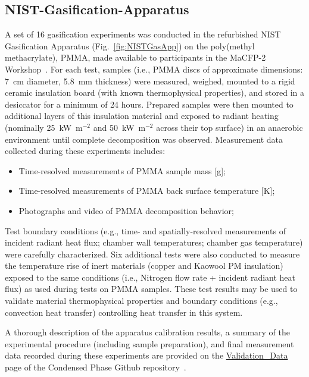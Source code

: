 \documentclass[12pt]{article}
\begin{document}
\subsection{NIST-Gasification-Apparatus}
A set of 16 gasification experiments was conducted in the refurbished NIST Gasification Apparatus (Fig.~\ref{fig:NISTGasApp}) on the poly(methyl methacrylate), PMMA, made available to participants in the MaCFP-2 Workshop~\cite{Leventon2023Gasification}. For each test, samples (i.e., PMMA discs of approximate dimensions: 7~cm diameter, 5.8~mm thickness) were measured, weighed, mounted to a rigid ceramic insulation board (with known thermophysical properties), and stored in a desiccator for a minimum of 24 hours. Prepared samples were then mounted to additional layers of this insulation material and exposed to radiant heating (nominally 25~kW~m$^{-2}$ and 50~kW~m$^{-2}$ across their top surface) in an anaerobic environment until complete decomposition was observed. Measurement data collected during these experiments includes:
\begin{itemize}[noitemsep]
\item Time-resolved measurements of PMMA sample mass [g];
\item Time-resolved measurements of PMMA back surface temperature [K];
\item Photographs and video of PMMA decomposition behavior;
\end{itemize}

Test boundary conditions (e.g., time- and spatially-resolved measurements of incident radiant heat flux; chamber wall temperatures; chamber gas temperature) were carefully characterized. Six additional tests were also conducted to measure the temperature rise of inert materials (copper and Kaowool PM insulation) exposed to the same conditions (i.e., Nitrogen flow rate + incident radiant heat flux) as used during tests on PMMA samples. These test results may be used to validate material thermophysical properties and boundary conditions (e.g., convection heat transfer) controlling heat transfer in this system.

A thorough description of the apparatus calibration results, a summary of the experimental procedure (including sample preparation), and final measurement data recorded during these experiments are provided on the \href{https://github.com/MaCFP/matl-db/tree/master/PMMA/Validation_Data/NIST_Gasification_Apparatus}{Validation\_Data} page of the Condensed Phase Github repository~\cite{MaCFP-cond-db}.
\end{document}
